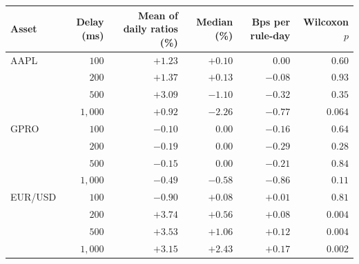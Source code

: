 \begin{tabular}{lrrrrr}
\toprule
Asset & Delay (ms) & Mean of daily ratios (\%) & Median (\%) & Bps per rule-day & Wilcoxon $p$ \\
\midrule
AAPL & $100$ & $+1.23$ & $+0.10$ & $0.00$ & $0.60$ \\
 & $200$ & $+1.37$ & $+0.13$ & $-0.08$ & $0.93$ \\
 & $500$ & $+3.09$ & $-1.10$ & $-0.32$ & $0.35$ \\
 & $1{,}000$ & $+0.92$ & $-2.26$ & $-0.77$ & $0.064$ \\
\midrule
GPRO & $100$ & $-0.10$ & $0.00$ & $-0.16$ & $0.64$ \\
 & $200$ & $-0.19$ & $0.00$ & $-0.29$ & $0.28$ \\
 & $500$ & $-0.15$ & $0.00$ & $-0.21$ & $0.84$ \\
 & $1{,}000$ & $-0.49$ & $-0.58$ & $-0.86$ & $0.11$ \\
\midrule
EUR/USD & $100$ & $-0.90$ & $+0.08$ & $+0.01$ & $0.81$ \\
 & $200$ & $+3.74$ & $+0.56$ & $+0.08$ & $0.004$ \\
 & $500$ & $+3.53$ & $+1.06$ & $+0.12$ & $0.004$ \\
 & $1{,}000$ & $+3.15$ & $+2.43$ & $+0.17$ & $0.002$ \\
\bottomrule
\end{tabular}
